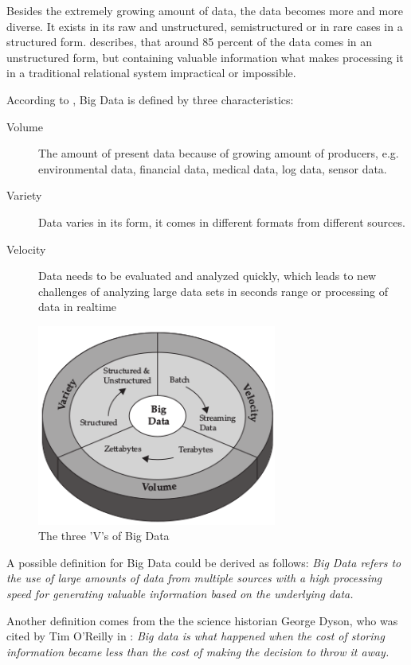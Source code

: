 Besides the extremely growing amount of data, the data becomes more and more diverse.
It exists in its raw and unstructured, semistructured or in rare cases in a structured form.
\cite{Bitk12} describes, that around 85 percent of the data comes in an unstructured
form, but containing valuable information what makes processing it in a traditional
relational system impractical or impossible.

According to \cite{Marz15} \cite{Ziko12}, Big Data is defined by three characteristics:
\begin{description}
    \item [Volume] The amount of present data because of growing amount of producers,
    e.g. environmental data, financial data, medical data, log data, sensor data.
    \item [Variety] Data varies in its form, it comes in different formats from different sources.
    \item [Velocity] Data needs to be evaluated and analyzed quickly, which leads to new challenges
    of analyzing large data sets in seconds range or processing of data in realtime
\end{description}
\begin{figure}[H]
	\centering
	\includegraphics[width=0.7\textwidth]{../images/03-three-vs-of-bigdata.png}
	\caption{The three 'V's of Big Data{\cite{Ziko12}}}
	\label{three-vs-of-bigdata}
\end{figure}

A possible definition for Big Data could be derived as follows: \textit{Big Data refers to the use
of large amounts of data from multiple sources with a high processing speed for generating
valuable information based on the underlying data.}

Another definition comes from the the science historian George Dyson, who was cited by
Tim O'Reilly in \cite{Dys13}:
\textit{Big data is what happened when the cost of storing information became less than the
cost of making the decision to throw it away.}

